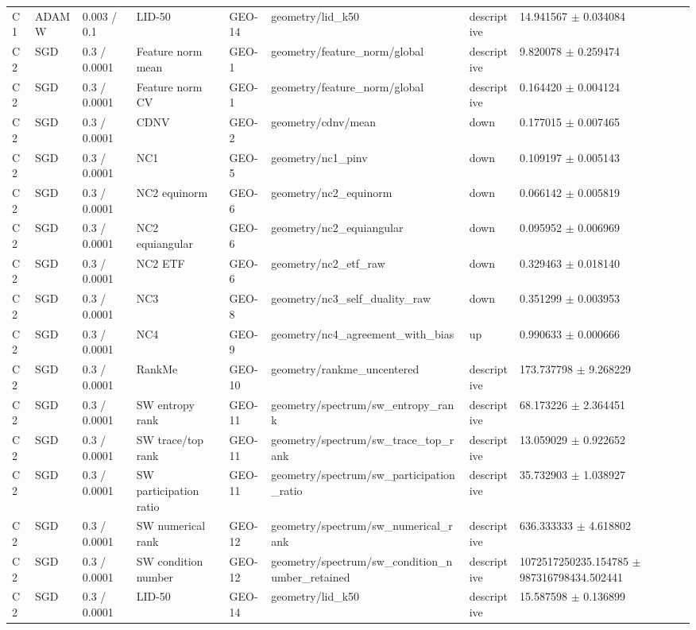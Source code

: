 \begin{longtable}{llllllll}
C1 & ADAMW & 0.003 / 0.1 & LID-50 & GEO-14 & geometry/lid\_k50 & descriptive & 14.941567 $\pm$ 0.034084 \\
C2 & SGD & 0.3 / 0.0001 & Feature norm mean & GEO-1 & geometry/feature\_norm/global & descriptive & 9.820078 $\pm$ 0.259474 \\
C2 & SGD & 0.3 / 0.0001 & Feature norm CV & GEO-1 & geometry/feature\_norm/global & descriptive & 0.164420 $\pm$ 0.004124 \\
C2 & SGD & 0.3 / 0.0001 & CDNV & GEO-2 & geometry/cdnv/mean & down & 0.177015 $\pm$ 0.007465 \\
C2 & SGD & 0.3 / 0.0001 & NC1 & GEO-5 & geometry/nc1\_pinv & down & 0.109197 $\pm$ 0.005143 \\
C2 & SGD & 0.3 / 0.0001 & NC2 equinorm & GEO-6 & geometry/nc2\_equinorm & down & 0.066142 $\pm$ 0.005819 \\
C2 & SGD & 0.3 / 0.0001 & NC2 equiangular & GEO-6 & geometry/nc2\_equiangular & down & 0.095952 $\pm$ 0.006969 \\
C2 & SGD & 0.3 / 0.0001 & NC2 ETF & GEO-6 & geometry/nc2\_etf\_raw & down & 0.329463 $\pm$ 0.018140 \\
C2 & SGD & 0.3 / 0.0001 & NC3 & GEO-8 & geometry/nc3\_self\_duality\_raw & down & 0.351299 $\pm$ 0.003953 \\
C2 & SGD & 0.3 / 0.0001 & NC4 & GEO-9 & geometry/nc4\_agreement\_with\_bias & up & 0.990633 $\pm$ 0.000666 \\
C2 & SGD & 0.3 / 0.0001 & RankMe & GEO-10 & geometry/rankme\_uncentered & descriptive & 173.737798 $\pm$ 9.268229 \\
C2 & SGD & 0.3 / 0.0001 & SW entropy rank & GEO-11 & geometry/spectrum/sw\_entropy\_rank & descriptive & 68.173226 $\pm$ 2.364451 \\
C2 & SGD & 0.3 / 0.0001 & SW trace/top rank & GEO-11 & geometry/spectrum/sw\_trace\_top\_rank & descriptive & 13.059029 $\pm$ 0.922652 \\
C2 & SGD & 0.3 / 0.0001 & SW participation ratio & GEO-11 & geometry/spectrum/sw\_participation\_ratio & descriptive & 35.732903 $\pm$ 1.038927 \\
C2 & SGD & 0.3 / 0.0001 & SW numerical rank & GEO-12 & geometry/spectrum/sw\_numerical\_rank & descriptive & 636.333333 $\pm$ 4.618802 \\
C2 & SGD & 0.3 / 0.0001 & SW condition number & GEO-12 & geometry/spectrum/sw\_condition\_number\_retained & descriptive & 1072517250235.154785 $\pm$ 987316798434.502441 \\
C2 & SGD & 0.3 / 0.0001 & LID-50 & GEO-14 & geometry/lid\_k50 & descriptive & 15.587598 $\pm$ 0.136899 \\

\end{longtable}

